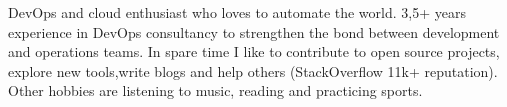 

\begin{cvparagraph}

DevOps and cloud enthusiast who loves to automate the world. 3,5+ years experience in DevOps consultancy to strengthen the bond between development and operations teams.
In spare time I like to contribute to open source projects, explore new tools,write blogs and help others (StackOverflow 11k+ reputation).
Other hobbies are listening to music, reading and practicing sports.

\end{cvparagraph}
